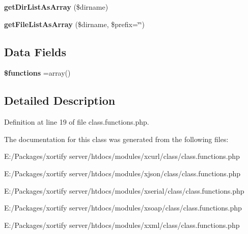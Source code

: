 \begin{DoxyCompactItemize}
\item 
\hypertarget{class_functions_handler_a7a976c031e5562502b91e587839da05a}{{\bfseries get\-Dir\-List\-As\-Array} (\$dirname)}\label{class_functions_handler_a7a976c031e5562502b91e587839da05a}

\item 
\hypertarget{class_functions_handler_a2587d6022abcec11c4dd150b341da93f}{{\bfseries get\-File\-List\-As\-Array} (\$dirname, \$prefix=\char`\"{}\char`\"{})}\label{class_functions_handler_a2587d6022abcec11c4dd150b341da93f}

\end{DoxyCompactItemize}
\subsection*{Data Fields}
\begin{DoxyCompactItemize}
\item 
\hypertarget{class_functions_handler_aa75daea491817f3b64daa2f51128bcdf}{{\bfseries \$functions} =array()}\label{class_functions_handler_aa75daea491817f3b64daa2f51128bcdf}

\end{DoxyCompactItemize}


\subsection{Detailed Description}


Definition at line 19 of file class.\-functions.\-php.



The documentation for this class was generated from the following files\-:\begin{DoxyCompactItemize}
\item 
E\-:/\-Packages/xortify server/htdocs/modules/xcurl/class/class.\-functions.\-php\item 
E\-:/\-Packages/xortify server/htdocs/modules/xjson/class/class.\-functions.\-php\item 
E\-:/\-Packages/xortify server/htdocs/modules/xserial/class/class.\-functions.\-php\item 
E\-:/\-Packages/xortify server/htdocs/modules/xsoap/class/class.\-functions.\-php\item 
E\-:/\-Packages/xortify server/htdocs/modules/xxml/class/class.\-functions.\-php\end{DoxyCompactItemize}
